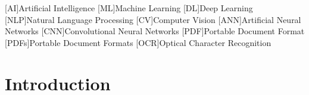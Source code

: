 \documentclass[english, 12pt, a4paper, elec, utf8, a-2b, online]{aaltothesis}
\begin{document}
\cleardoublepage

[AI]{Artificial Intelligence}
[ML]{Machine Learning}
[DL]{Deep Learning}
[NLP]{Natural Language Processing}
[CV]{Computer Vision}
[ANN]{Artificial Neural Networks}
[CNN]{Convolutional Neural Networks}
[PDF]{Portable Document Format}
[PDFs]{Portable Document Formats}
[OCR]{Optical Character Recognition}

\begin{acronym}
\end{acronym}

\section{Introduction}
\label{sec:intro}

\thispagestyle{empty}


\end{document}
